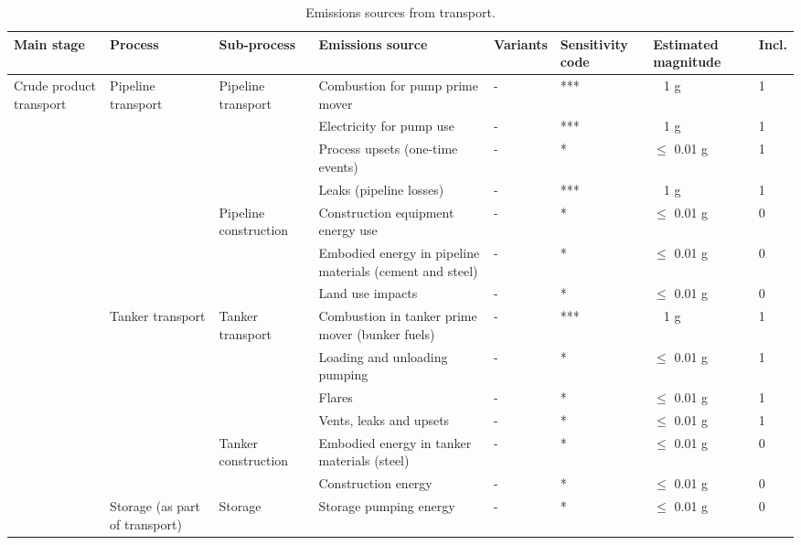 \documentclass[11pt]{report}
\begin{document}
{{{{\begin{landscape}
\begin{table}
\begin{scriptsize}
\caption{Emissions sources from transport.}
\label{tab:transport_sources}
\begin{tabular}{|p{}|p{}|p{}|p{}|p{}|p{}|p{}|p{}|}
\hline
\textbf{Main stage} & \textbf{Process} & \textbf{Sub-process} & \textbf{Emissions source} & \textbf{Variants}& \textbf{Sensitivity code} & \textbf{Estimated magnitude} & \textbf{Incl.}\\
\hline
\multirow{18}{0.08\columnwidth}{Crude product transport} & \multirow{7}{0.09\columnwidth}{Pipeline transport} & \multirow{4}{0.12\columnwidth}{Pipeline transport} & Combustion for pump prime mover & - & *** & ~ 1 g & 1\\
\cline{4-8}
& & & Electricity for pump use & - & *** & ~ 1 g & 1\\
\cline{4-8}
& & & Process upsets (one-time events) & - & * & $\leq$ 0.01 g & 1\\
\cline{4-8}
& & & Leaks (pipeline losses) & - & *** & ~ 1 g & 1\\
\cline{3-8}
& & \multirow{3}{0.12\columnwidth}{Pipeline construction} & Construction equipment energy use & - & * & $\leq$ 0.01 g & 0\\
\cline{4-8}
& & & Embodied energy in pipeline materials (cement and steel) & - & * & $\leq$ 0.01 g & 0\\
\cline{4-8}
& & & Land use impacts & - & * & $\leq$ 0.01 g & 0\\
\cline{2-8}
& \multirow{6}{0.09\columnwidth}{Tanker transport} & \multirow{4}{0.12\columnwidth}{Tanker transport} & Combustion in tanker prime mover (bunker fuels) & - & *** & ~ 1 g & 1\\
\cline{4-8}
& & & Loading and unloading pumping & - & * & $\leq$ 0.01 g & 1\\
\cline{4-8}
& & & Flares & - & * & $\leq$ 0.01 g & 1\\
\cline{4-8}
& & & Vents, leaks and upsets & - & * & $\leq$ 0.01 g & 1\\
\cline{3-8}
& & \multirow{2}{0.12\columnwidth}{Tanker construction} & Embodied energy in tanker materials (steel) & - & * & $\leq$ 0.01 g & 0\\
\cline{4-8}
& & & Construction energy & - & * & $\leq$ 0.01 g & 0\\
\cline{2-8}
& \multirow{5}{0.09\columnwidth}{Storage (as part of transport)} & \multirow{5}{0.12\columnwidth}{Storage} & Storage pumping energy & - & * & $\leq$ 0.01 g & 0\\

\end{tabular}
\end{scriptsize}
\end{table}
\end{landscape}}}}}
\end{document}
